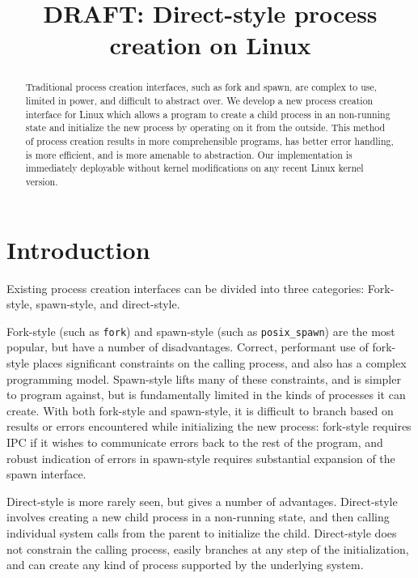 \documentclass[letterpaper,twocolumn,10pt]{article}
\begin{document}
\newcommand{\twosigma}{[tech company]} 
\date{}
\title{\Large \bf DRAFT: Direct-style process creation on Linux}
\maketitle
\begin{abstract}
Traditional process creation interfaces,
such as fork and spawn,
are complex to use, limited in power, and difficult to abstract over.
We develop a new process creation interface for Linux
which allows a program to create a child process in an non-running state
and initialize the new process by operating on it from the outside.
This method of process creation results in more comprehensible programs, 
has better error handling,
is more efficient,
and is more amenable to abstraction.
Our implementation is immediately deployable without kernel modifications on any recent Linux kernel version.
\end{abstract}

\section{Introduction}\label{introduction}
Existing process creation interfaces can be divided into three categories:
Fork-style, spawn-style, and direct-style.

Fork-style (such as \texttt{fork}) and spawn-style (such as \texttt{posix\_spawn}) are the most popular,
but have a number of disadvantages.
Correct, performant use of fork-style places significant constraints on the calling process,
and also has a complex programming model.
Spawn-style lifts many of these constraints, and is simpler to program against,
but is fundamentally limited in the kinds of processes it can create.
With both fork-style and spawn-style,
it is difficult to
branch based on results or errors encountered while initializing the new process:
fork-style requires IPC if it wishes to communicate errors back to the rest of the program,
and robust indication of errors in spawn-style requires substantial expansion of the spawn interface.

Direct-style is more rarely seen, but gives a number of advantages.
Direct-style involves creating a new child process in a non-running state,
and then calling individual system calls from the parent to initialize the child.
Direct-style does not constrain the calling process,
easily branches at any step of the initialization,
and can create any kind of process supported by the underlying system.
\end{document}

